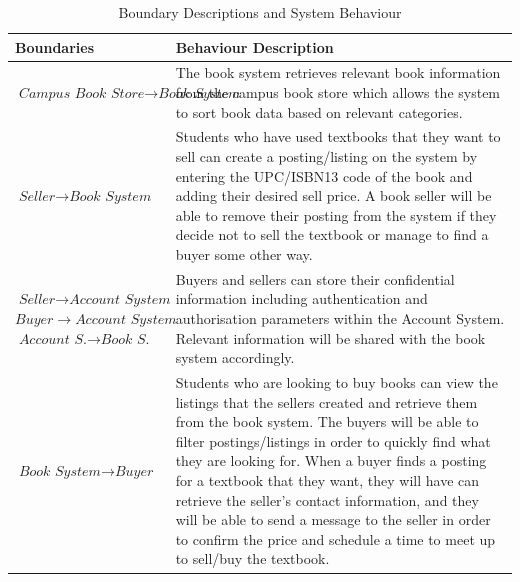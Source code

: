 \documentclass[fullpage]{article}
\begin{document}
\begin{table}[H]
\flushleft
\begin{tabular}{|p{4cm}|p{10cm}|}
\hline
 \rowcolor{lightgray} 
\textbf{Boundaries} & \textbf{Behaviour Description}\\
\hline
$\textit{Campus Book Store} \rightarrow \textit{Book System}$ & The book system retrieves relevant book information from the campus book store which allows the system to sort book data based on relevant categories.\\
\hline
$\textit{Seller} \rightarrow \textit{Book System}$ & Students who have used textbooks that they want to sell can create a posting/listing on the system by entering the UPC/ISBN13 code of the book and adding their desired sell price. A book seller will be able to remove their posting from the system if they decide not to sell the textbook or manage to find a buyer some other way.\\
\hline
$ \textit{Seller} \rightarrow \textit{Account System}$ \newline $Buyer \rightarrow \textit{Account System}$ \newline $\textit{Account S.} \rightarrow \textit{Book S.}$ &Buyers and sellers can store their confidential information including authentication and authorisation parameters within the Account System. Relevant information will be shared with the book system accordingly.\\
\hline
$\textit{Book System} \rightarrow \textit{Buyer}$ & Students who are looking to buy books can view the listings that the sellers created and retrieve them from the book system. The buyers will be able to filter postings/listings in order to quickly find what they are looking for. When a buyer finds a posting for a textbook that they want, they will have can retrieve the seller's contact information, and they will be able to send a message to the seller in order to confirm the price and schedule a time to meet up to sell/buy the textbook.\\
\hline
\end{tabular}
\caption{Boundary Descriptions and System Behaviour}
\end{table}


\newpage
\end{document}
